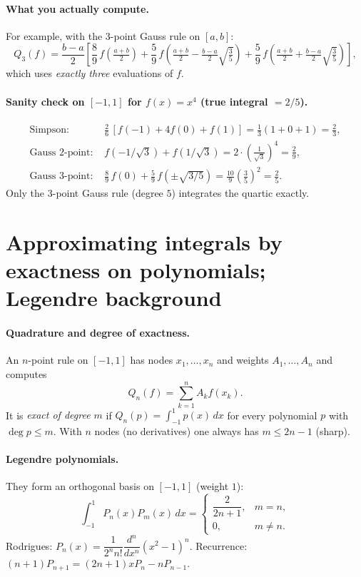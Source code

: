 \documentclass[11pt,a4paper]{article}
\theoremstyle{definition}
\theoremstyle{definition}
\theoremstyle{plain}
\theoremstyle{remark}
\begin{document}
\paragraph{What you actually compute.}
For example, with the 3-point Gauss rule on \([a,b]\):
\[
Q_3(f)=\frac{b-a}{2}\left[\frac{8}{9}\,f\!\left(\tfrac{a+b}{2}\right)
+\frac{5}{9}\,f\!\left(\tfrac{a+b}{2}-\tfrac{b-a}{2}\sqrt{\tfrac{3}{5}}\right)
+\frac{5}{9}\,f\!\left(\tfrac{a+b}{2}+\tfrac{b-a}{2}\sqrt{\tfrac{3}{5}}\right)\right],
\]
which uses \emph{exactly three} evaluations of \(f\).

\paragraph{Sanity check on \([-1,1]\) for \(f(x)=x^4\) (true integral \(=2/5\)).}
\[
\begin{aligned}
	\text{Simpson: }&\frac{2}{6}\,[f(-1)+4f(0)+f(1)]=\frac{1}{3}(1+0+1)=\frac{2}{3},\\
	\text{Gauss 2-point: }& f(-1/\sqrt3)+f(1/\sqrt3)=2\cdot\left(\frac{1}{\sqrt3}\right)^4=\frac{2}{9},\\
	\text{Gauss 3-point: }& \frac{8}{9}\,f(0)+\frac{5}{9}\,f(\pm\sqrt{3/5})
	=\frac{10}{9}\left(\frac{3}{5}\right)^2=\frac{2}{5}.
\end{aligned}
\]
Only the 3-point Gauss rule (degree \(5\)) integrates the quartic exactly.

\section*{Approximating integrals by exactness on polynomials; Legendre background}

\paragraph{Quadrature and degree of exactness.}
An \(n\)-point rule on \([-1,1]\) has nodes \(x_1,\dots,x_n\) and weights \(A_1,\dots,A_n\) and computes
\[
Q_n(f)=\sum_{k=1}^n A_k f(x_k).
\]
It is \emph{exact of degree \(m\)} if \(Q_n(p)=\int_{-1}^{1}p(x)\,dx\) for every polynomial \(p\) with \(\deg p\le m\).
With \(n\) nodes (no derivatives) one always has \(m\le 2n-1\) (sharp).

\paragraph{Legendre polynomials.}
They form an orthogonal basis on \([-1,1]\) (weight \(1\)):
\[
\int_{-1}^{1}P_n(x)P_m(x)\,dx=\begin{cases}\dfrac{2}{2n+1},&m=n,\\[4pt]0,&m\ne n.\end{cases}
\]
Rodrigues: \(P_n(x)=\dfrac{1}{2^n n!}\dfrac{d^n}{dx^n}(x^2-1)^n\).
Recurrence: \((n+1)P_{n+1}=(2n+1)xP_n-nP_{n-1}\).
\end{document}
